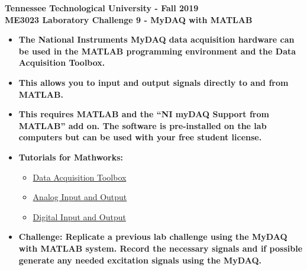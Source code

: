 \documentclass[11pt]{article}
\newcommand{\NUM}{9}
\begin{document}
\textbf{ \Large Tennessee Technological University - Fall 2019} \vspace{3mm}\\
\textbf{ \Large ME3023 Laboratory Challenge \NUM\hspace{2mm} - MyDAQ with MATLAB} \\

\begin{itemize}	
	\item \textbf{ \large The National Instruments MyDAQ data acquisition hardware can be used in the MATLAB programming environment and the Data Acquisition Toolbox.} \\
	
	\item \textbf{ \large  This allows you to input and output signals directly to and from MATLAB.} \\
	
	\item \textbf{ \large This requires MATLAB and the ``NI myDAQ Support from MATLAB'' add on. The software is pre-installed on the lab computers but can be used with your free student license.} \\

	\item \textbf{ \large Tutorials for Mathworks:}\\
	\begin{itemize}
	\item \href{https://www.mathworks.com/help/daq/index.html}{Data Acquisition Toolbox}	
	
	\item \href{https://www.mathworks.com/help/daq/analog-input-and-output.html}{Analog Input and Output}	

	\item \href{https://www.mathworks.com/help/daq/digital-input-and-output.html}{Digital Input and Output} \\
	\end{itemize}	

	\item \textbf{ \large Challenge: Replicate a previous lab challenge using the MyDAQ with MATLAB system. Record the necessary signals and if possible generate any needed excitation signals using the MyDAQ.}\\
	\end{itemize}	

	
\end{document}
